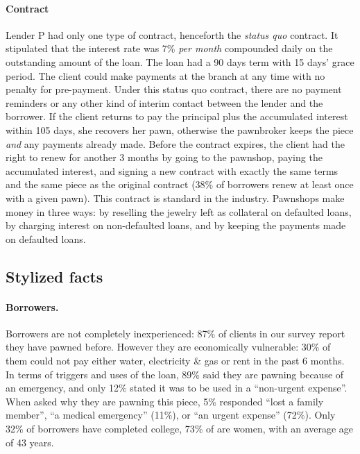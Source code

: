 \documentclass[12pt, a4paper]{article}
\begin{document}
\paragraph*{Contract} Lender P had only one type of contract, henceforth the \textit{status quo} contract. It stipulated that the interest rate was 7\% \textit{per month} compounded daily on the outstanding amount of the loan. The loan had a 90 days term with 15 days' grace period. The client could make payments at the branch at any time with no penalty for pre-payment. Under this status quo contract, there are no payment reminders or any other kind of interim contact between the lender and the borrower. If the client returns to pay the principal plus the accumulated interest within 105 days, she recovers her pawn, otherwise the pawnbroker keeps the piece \textit{and} any payments already made. Before the contract expires, the client had the right to renew for another 3 months by going to the pawnshop, paying the accumulated interest, and signing a new contract with exactly the same terms and the same piece as the original contract (38\% of borrowers renew at least once with a given pawn). This contract is standard in the industry.  Pawnshops make money in three ways: by reselling the jewelry left as collateral on defaulted loans, by charging interest on non-defaulted loans, and by keeping the payments made on defaulted loans. 

\subsection{Stylized facts}

\paragraph*{Borrowers.} Borrowers are not completely inexperienced: 87\% of clients in our survey report they have pawned before. %
However they are economically vulnerable:  30\% of them could not pay either water, electricity \& gas or rent in the past 6 months. In terms of triggers and uses of the loan, 89\% said they are pawning because of an emergency, and only 12\% stated it was to be used in a ``non-urgent expense''.  When asked why they are pawning this piece, 5\% responded ``lost a family member'', ``a medical emergency'' (11\%), or ``an urgent expense'' (72\%). Only 32\% of borrowers have completed college, 73\% of are women, with an average age of 43 years.
\end{document}
